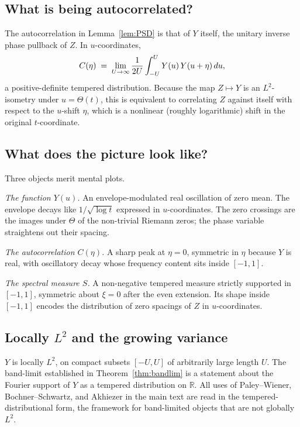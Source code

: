 \documentclass{article}
\newcommand{\tmem}[1]{{\em #1\/}}
\begin{document}
\subsection{What is being autocorrelated?}\label{app:autocorr}

The autocorrelation in Lemma~\ref{lem:PSD} is that of $Y$ itself, the unitary
inverse phase pullback of $Z$. In $u$-coordinates,
\[ C (\eta) \hspace{0.27em} = \hspace{0.27em} \lim_{U \to \infty}  \frac{1}{2
   U}  \int_{- U}^U Y (u)  \hspace{0.17em} Y (u + \eta)  \hspace{0.17em} du,
\]
a positive-definite tempered distribution. Because the map $Z \mapsto Y$ is an
$L^2$-isometry under $u = \Theta (t)$, this is equivalent to correlating $Z$
against itself with respect to the $u$-shift $\eta$, which is a nonlinear
(roughly logarithmic) shift in the original $t$-coordinate.

\subsection{What does the picture look like?}\label{app:picture}

Three objects merit mental plots.

{\tmem{The function $Y (u)$.}} An envelope-modulated real oscillation of zero
mean. The envelope decays like $1 / \sqrt{\log t}$ expressed in
$u$-coordinates. The zero crossings are the images under $\Theta$ of the
non-trivial Riemann zeros; the phase variable straightens out their spacing.

{\tmem{The autocorrelation $C (\eta)$.}} A sharp peak at $\eta = 0$, symmetric
in $\eta$ because $Y$ is real, with oscillatory decay whose frequency content
sits inside $[- 1, 1]$.

{\tmem{The spectral measure $S$.}} A non-negative tempered measure strictly
supported in $[- 1, 1]$, symmetric about $\xi = 0$ after the even extension.
Its shape inside $[- 1, 1]$ encodes the distribution of zero spacings of $Z$
in $u$-coordinates.

\subsection{Locally $L^2$ and the growing variance}\label{app:localL2}

$Y$ is locally $L^2$, on compact subsets $[- U, U]$ of arbitrarily large
length $U$. The band-limit established in Theorem~\ref{thm:bandlim} is a
statement about the Fourier support of $Y$ as a tempered distribution on
$\mathbb{R}$. All uses of Paley--Wiener, Bochner--Schwartz, and Akhiezer in
the main text are read in the tempered-distributional form, the framework for
band-limited objects that are not globally $L^2$.
\end{document}
